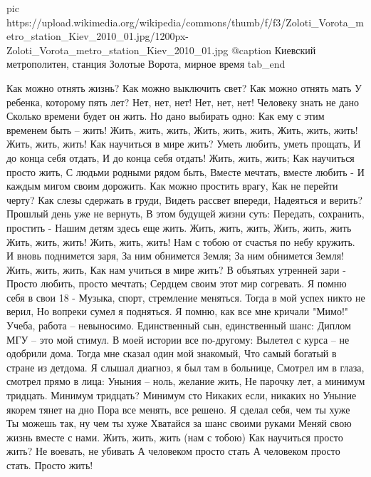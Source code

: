 		 pic https://upload.wikimedia.org/wikipedia/commons/thumb/f/f3/Zoloti_Vorota_metro_station_Kiev_2010_01.jpg/1200px-Zoloti_Vorota_metro_station_Kiev_2010_01.jpg
		 @caption Киевский метрополитен, станция Золотые Ворота, мирное время
  tab_end
\fi

\raggedcolumns
\begin{multicols}{2} %
\setlength{\parindent}{0pt}

\obeycr
Как можно отнять жизнь?
Как можно выключить свет?
Как можно отнять мать
У ребенка, которому пять лет?
\smallskip
Нет, нет, нет!
Нет, нет, нет!
\smallskip
Человеку знать не дано
Сколько времени будет он жить.
Но дано выбирать одно:
Как ему с этим временем быть – жить!
\smallskip
Жить, жить, жить,
Жить, жить, жить,
Жить, жить, жить!
Жить, жить, жить!
\smallskip
Как научиться в мире жить?
Уметь любить, уметь прощать,
И до конца себя отдать,
И до конца себя отдать!
\smallskip
Жить, жить, жить;
Как научиться просто жить,
С людьми родными рядом быть,
Вместе мечтать, вместе любить -
И каждым мигом своим дорожить.
\smallskip
Как можно простить врагу,
Как не перейти черту?
Как слезы сдержать в груди,
Видеть рассвет впереди,
Надеяться и верить?
\smallskip
Прошлый день уже не вернуть,
В этом будущей жизни суть:
Передать, сохранить, простить -
Нашим детям здесь еще жить.
\smallskip
Жить, жить, жить,
Жить, жить, жить
Жить, жить, жить!
Жить, жить, жить!
\smallskip
Нам с тобою от счастья по небу кружить.
И вновь поднимется заря,
За ним обнимется Земля;
За ним обнимется Земля!
\smallskip
Жить, жить, жить,
Как нам учиться в мире жить?
В объятьях утренней зари -
Просто любить, просто мечтать;
Сердцем своим этот мир согревать.
\smallskip
Я помню себя в свои 18 -
Музыка, спорт, стремление меняться.
Тогда в мой успех никто не верил,
Но вопреки сумел я подняться.
\smallskip
Я помню, как все мне кричали "Мимо!"
Учеба, работа – невыносимо.
Единственный сын, единственный шанс:
Диплом МГУ – это мой стимул.
\smallskip
В моей истории все по-другому:
Вылетел с курса – не одобрили дома.
Тогда мне сказал один мой знакомый,
Что самый богатый в стране из детдома.
\smallskip
Я слышал диагноз, я был там в больнице,
Смотрел им в глаза, смотрел прямо в лица:
Уныния – ноль, желание жить,
Не парочку лет, а минимум тридцать.
\smallskip
Минимум тридцать? Минимум сто
Никаких если, никаких но
Уныние якорем тянет на дно
Пора все менять, все решено.
\smallskip
Я сделал себя, чем ты хуже
Ты можешь так, ну чем ты хуже
Хватайся за шанс своими руками
Меняй свою жизнь вместе с нами.
\smallskip
Жить, жить, жить (нам с тобою)
Как научиться просто жить?
\smallskip
Не воевать, не убивать
А человеком просто стать
А человеком просто стать.
\smallskip
Просто жить!
\restorecr
\end{multicols} %

